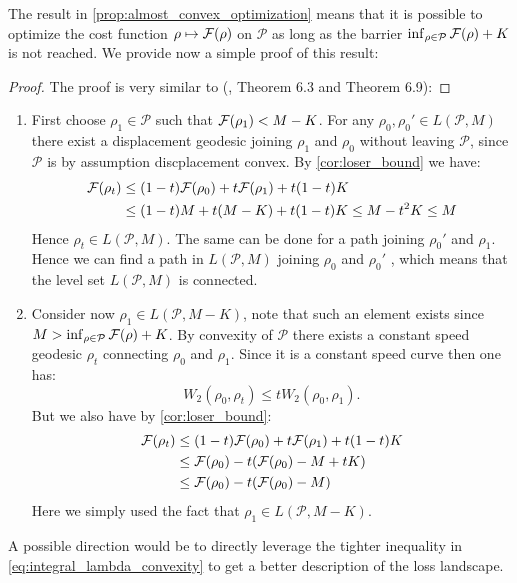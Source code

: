 %
\begin{remark}
The result in \cref{prop:almost_convex_optimization} means that it is possible to optimize the cost function $\rho\mapsto {{\mathcal F}}(\rho)$
on $\mathcal{P}$ as long as the barrier $\inf_{\rho\in\mathcal{P}}{{\mathcal F}}(\rho)+K$
is not reached. We provide now a simple proof of this result:
\end{remark}
%
\begin{proof}
The proof is very similar to (\cite{Bottou:2017}, Theorem 6.3 and
Theorem 6.9): 
\end{proof}
\begin{enumerate}
\item First choose $\rho_{1}\in\mathcal{P}$ such that ${{\mathcal F}}(\rho_{1})<M-K$.
For any $\rho_{0},\rho_{0}'\in L(\mathcal{P},M)$ there exist a displacement
geodesic joining $\rho_{1}$ and $\rho_{0}$ without leaving $\mathcal{P}$,
since $\mathcal{P}$ is by assumption discplacement convex. By \cref{cor:loser_bound}
we have:
\begin{align*}
{{\mathcal F}}(\rho_{t}) & \leq(1-t){{\mathcal F}}(\rho_{0})+t{{\mathcal F}}(\rho_{1})+t(1-t)K\\
 & \leq(1-t)M+t(M-K)+t(1-t)K\leq M-t^{2}K\leq M
\end{align*}
Hence $\rho_{t}\in L(\mathcal{P},M)$. The same can be done for a
path joining $\rho_{0}'$ and $\rho_{1}$. Hence we can find a path
in $L(\mathcal{P},M)$ joining $\rho_{0}$ and $\rho_{0}'$ , which
means that the level set $L(\mathcal{P},M)$ is connected.
\item Consider now $\rho_{1}\in L(\mathcal{P},M-K)$, note that such an
element exists since $M>\inf_{\rho\in\mathcal{P}}{{\mathcal F}}(\rho)+K$.
By convexity of $\mathcal{P}$ there exists a constant speed geodesic
$\rho_{t}$ connecting $\rho_{0}$ and $\rho_{1}$. Since it is a
constant speed curve then one has:
\[
W_{2}(\rho_{0},\rho_{t})\leq tW_{2}(\rho_{0},\rho_{1}).
\]
But we also have by \cref{cor:loser_bound}:
\begin{align*}
{{\mathcal F}}(\rho_{t}) & \leq(1-t){{\mathcal F}}(\rho_{0})+t{{\mathcal F}}(\rho_{1})+t(1-t)K\\
 & \leq {{\mathcal F}}(\rho_{0})-t({{\mathcal F}}(\rho_{0})-M+tK)\\
 & \leq {{\mathcal F}}(\rho_{0})-t({{\mathcal F}}(\rho_{0})-M)
\end{align*}
Here we simply used the fact that $\rho_{1}\in L(\mathcal{P},M-K)$. 
\end{enumerate}
%

\begin{remark}
	A possible direction would be to directly leverage the tighter inequality in \cref{eq:integral_lambda_convexity} to get a better description of the loss landscape.
\end{remark}

